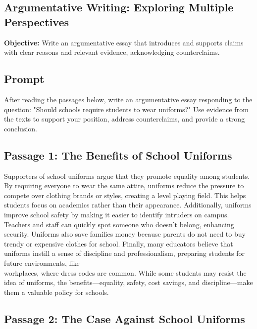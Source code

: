 \documentclass[12pt]{article}
\begin{document}
\subsection*{Argumentative Writing: Exploring Multiple Perspectives}
\onehalfspacing

\begin{tcolorbox}[colframe=black!40, colback=gray!0, title=Learning Objective]
\textbf{Objective:} Write an argumentative essay that introduces and supports claims with clear reasons and relevant evidence, acknowledging counterclaims.
\end{tcolorbox}
\subsection*{Prompt}

After reading the passages below, write an argumentative essay responding to the question:  
"Should schools require students to wear uniforms?"  
Use evidence from the texts to support your position, address counterclaims, and provide a strong \\conclusion.
\subsection*{Passage 1: The Benefits of School Uniforms}

Supporters of school uniforms argue that they promote equality among students. By requiring everyone to wear the same attire, uniforms reduce the pressure to compete over clothing brands or styles, creating a level playing field. This helps students focus on academics rather than their appearance. Additionally, uniforms improve school safety by making it easier to identify intruders on campus. Teachers and staff can quickly spot someone who doesn’t belong, enhancing security. Uniforms also save families money because parents do not need to buy trendy or expensive clothes for school. Finally, many educators believe that uniforms instill a sense of discipline and professionalism, preparing students for future environments, like \\workplaces, where dress codes are common. While some students may resist the idea of uniforms, the benefits—equality, safety, cost savings, and discipline—make them a valuable policy for schools.
\newpage
\subsection*{Passage 2: The Case Against School Uniforms}
\end{document}
